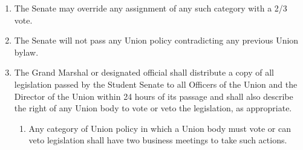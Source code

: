 \documentclass{uniondoc}
\begin{document}
\begin{enumerate}
\begin{enumerate}
\begin{enumerate}
\begin{enumerate}
			                  \end{enumerate}
			            \item Operational policy; policies setting operational standards for Union facilities, and the broad usage of Union resources, as well as broad goals and priorities.
			                  All legislation in this area may be vetoed by the PU, and overridden by a 2/3 vote of the Senate.
			            \item Governance Standards; legislation setting standards for the governance of the Union.
			                  This may include requiring transparency reports, conflict of interests policy, or reporting requirements.
			                  This will also include all rules on selection and appointment, and the Union Media Statement.
			                  \begin{enumerate}
				                  \item The Union Media statement will require a 2/3 vote of the Senate to modify.
			                  \end{enumerate}
			            \item Jurisdictional and Limitations Policy; where not provided for in the Union Constitution, the Senate shall adopt legislation establishing the jurisdiction of Union bodies and organizations, and the limits on authority of Union bodies.
			                  The Elections Commission will advise if these proposed policies would contradict the Union Constitution, and inform the Senate accordingly.
		            \end{enumerate}
		      \item The Senate may override any assignment of any such category with a 2/3 vote.
		      \item The Senate will not pass any Union policy contradicting any previous Union bylaw.
		      \item The Grand Marshal or designated official shall distribute a copy of all legislation passed by the Student Senate to all Officers of the Union and the Director of the Union within 24 hours of its passage and shall also describe the right of any Union body to vote or veto the legislation, as appropriate.
		            \begin{enumerate}
			            \item Any category of Union policy in which a Union body must vote or can veto legislation shall have two business meetings to take such actions.
			                  \begin{enumerate}

\end{enumerate}
\end{enumerate}
\end{enumerate}
\end{enumerate}
\end{document}
